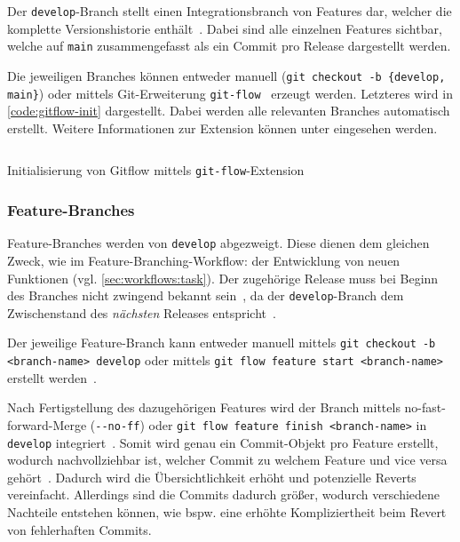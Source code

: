 Der \texttt{develop}-Branch stellt einen Integrationsbranch von Features dar, welcher die komplette Versionshistorie enthält~\cite{atlassianGitflowWorkflow}. Dabei sind alle einzelnen Features sichtbar, welche auf \texttt{main} zusammengefasst als ein Commit pro Release dargestellt werden.

Die jeweiligen Branches können entweder manuell (\texttt{git checkout -b \{develop, main\}}) oder mittels Git\hyp Erweiterung \texttt{git-flow}~\cite{driessenGitflow2012} erzeugt werden. Letzteres wird in \autoref{code:gitflow-init} dargestellt. Dabei werden alle relevanten Branches automatisch erstellt. Weitere Informationen zur Extension können unter \cite{kummerGitflowcheatsheet2023} eingesehen werden.

\begin{listing}
\inputminted[breaklines]{text}{src/assets/code/gitflow/gitflow_init.sh}
\caption{Initialisierung von Gitflow mittels \texttt{git-flow}-Extension}
\label{code:gitflow-init}
\end{listing}


\subsubsection{Feature-Branches}

Feature\hyp Branches werden von \texttt{develop} abgezweigt. Diese dienen dem gleichen Zweck, wie im Feature\hyp Branching\hyp Workflow: der Entwicklung von neuen Funktionen (vgl. \autoref{sec:workflows:task}). Der zugehörige Release muss bei Beginn des Branches nicht zwingend bekannt sein~\cite{driessenSuccessfulGitBranching2010}, da der \texttt{develop}\hyp Branch dem Zwischenstand des \emph{nächsten} Releases entspricht~\cite{atlassianGitflowWorkflow}.

Der jeweilige Feature\hyp Branch kann entweder manuell mittels \texttt{git checkout -b <branch-name> develop} oder mittels \texttt{git flow feature start <branch-name>} erstellt werden~\cite{driessenGitflow2012}.

Nach Fertigstellung des dazugehörigen Features wird der Branch mittels no\hyp fast\hyp forward\hyp Merge (\verb|--no-ff|) oder \texttt{git flow feature finish <branch-name>} in \texttt{develop} integriert~\cite{driessenSuccessfulGitBranching2010,driessenGitflow2012}. Somit wird genau ein Commit\hyp Objekt pro Feature erstellt, wodurch nachvollziehbar ist, welcher Commit zu welchem Feature und vice versa gehört~\cite{driessenSuccessfulGitBranching2010}. Dadurch wird die Übersichtlichkeit erhöht und potenzielle Reverts vereinfacht. Allerdings sind die Commits dadurch größer, wodurch verschiedene Nachteile entstehen können, wie bspw. eine erhöhte Kompliziertheit beim Revert von fehlerhaften Commits.

